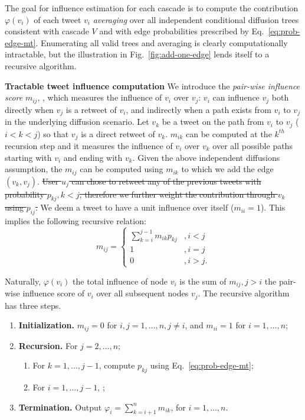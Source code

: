 \documentclass[a4paper,12pt]{article}
\newcommand{\rev}[1]{{\color{navy}{#1}}}
\begin{document}
The goal for influence estimation for each cascade is to compute the contribution $\varphi(v_i)$ of each tweet $v_i$ {\em averaging} over all independent conditional diffusion trees consistent with cascade $V$ and with edge probabilities prescribed by Eq.~\ref{eq:prob-edge-mt}. 
Enumerating all valid trees and averaging is clearly computationally intractable, but the illustration in Fig.~\ref{fig:add-one-edge} lends itself to a recursive algorithm. 

\textbf{Tractable tweet influence computation}
We introduce the \emph{pair-wise influence score} $m_{ij}$, \rev{$i<j$}, which measures the influence of $v_i$ over $v_j$:
$v_i$ can influence $v_j$ both directly when $v_j$ is a retweet of $v_i$, and indirectly when a path exists from $v_i$ to $v_j$ in the underlying diffusion scenario.
Let $v_k$ be a tweet on the path from $v_i$ to $v_j$ ($i < k < j$) so that $v_j$ is a direct retweet of $v_k$.
$m_{ik}$ can be computed at the $k^{th}$ recursion step and it measures the influence of $v_i$ over $v_k$ over all possible paths starting with $v_i$ and ending with $v_k$.
Given the above independent diffusions assumption, the $m_{ij}$ can be computed using $m_{ik}$ to which we add the edge $(v_k, v_j)$.
\st{User $u_j$ can chose to retweet any of the previous tweets with probability $p_{kj}, k < j$, therefore we further weight the contribution through $v_k$ using $p_{ij}$.}
We deem a tweet to have a unit influence over itself ($m_{ii} = 1$).
This implies the following recursive relation:
\begin{equation} \label{eq:Mij-mt}
m_{ij} =
\left\{
\begin{array}{ll}
	\sum^{j-1}_{k=i} m_{ik}p_{kj} &,i < j \\
	1 & ,i = j \\
	0 & ,i > j.
\end{array}
\right.
\end{equation}

Naturally, $\varphi(v_i)$ the total influence of node $v_i$ is the sum of $m_{ij}, j > i$ the pair-wise influence score of $v_i$ over all subsequent nodes $v_j$. 
The recursive algorithm has three steps. 
\begin{enumerate}
	\item {\bf Initialization.} $m_{ij}=0$ for $i, j=1,\ldots,n, j \neq i$, and $m_{ii} = 1$ for $i=1,\ldots,n$;
	\item {\bf Recursion.} For $j=2, \ldots, n$;
	\begin{enumerate}
		\item For $k=1, \ldots, j-1$, compute $p_{kj}$ using Eq.~\eqref{eq:prob-edge-mt};
		\item For $i=1, \ldots, j-1$, \rev{$m_{ij} = \sum_{k=i}^{j-1} m_{ik}p_{kj}$};
	\end{enumerate}
	\item {\bf Termination.} Output $\varphi_i= \sum_{k=i+1}^n m_{ik}$, for $i=1,\ldots,n$. 
\end{enumerate}
\end{document}
